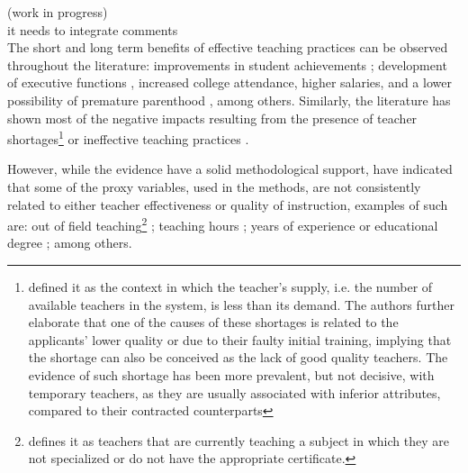 {\color{red} (work in progress) \\
	it needs to integrate comments \\
	
The short and long term benefits of effective teaching practices can be observed throughout the literature: improvements in student achievements \citet{Rockoff_2004, Rivkin_et_al_2005, Duflo_et_al_2009, Hanushek_et_al_2012, Muralidharan_et_al_2013, Chetty_et_al_2014a, Araujo_et_al_2016}; development of executive functions \cite{Araujo_et_al_2016}, increased college attendance, higher salaries, and a lower possibility of premature parenthood \cite{Chetty_et_al_2014b}, among others. Similarly, the literature has shown most of the negative impacts resulting from the presence of teacher shortages\footnote{\citet{Bertoni_et_al_2020a} defined it as the context in which the teacher's supply, i.e. the number of available teachers in the system, is less than its demand. The authors further elaborate that one of the causes of these shortages is related to the applicants' lower quality or due to their faulty initial training, implying that the shortage can also be conceived as the lack of good quality teachers. The evidence of such shortage has been more prevalent, but not decisive, with temporary teachers, as they are usually associated with inferior attributes, compared to their contracted counterparts} \cite{Duflo_et_al_2009, Muralidharan_et_al_2013, Duflo_et_al_2015, Ayala_2017, Marotta_2019} or ineffective teaching practices \cite{Hanushek_et_al_2012}.

However, while the evidence have a solid methodological support, \citet{Hanushek_et_al_2006} have indicated that some of the proxy variables, used in the methods, are not consistently related to either teacher effectiveness or quality of instruction, examples of such are: out of field teaching\footnote{\citet{Medeiros_et_al_2018} defines it as teachers that are currently teaching a subject in which they are not specialized or do not have the appropriate certificate.} \cite{Ingersoll_1998, Dee_et_al_2008, Bertoni_et_al_2020a}; teaching hours \cite{Bruns_et_al_2015}; years of experience or educational degree \cite{Rockoff_2004, Rivkin_et_al_2005, Clotfelter_et_al_2006, Clotfelter_et_al_2007, Hanushek_et_al_2012}; among others.

}
